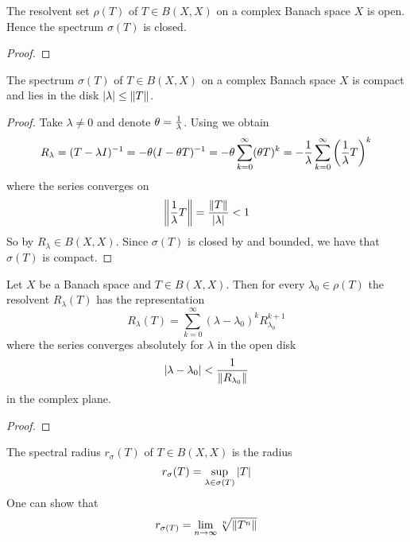 \documentclass[../../script.tex]{subfiles}
\begin{document}
\begin{thm}\label{thm:20.6}
    The resolvent set $\rho(T)$ of $T \in B(X, X)$ on a complex Banach space $X$ is open. Hence the spectrum $\sigma(T)$ is closed.
\end{thm}
\begin{proof}
    \noproof
\end{proof}

\begin{thm}
    The spectrum $\sigma(T)$ of $T \in B(X, X)$ on a complex Banach space $X$ is compact and lies in the disk $\abs{\lambda} \le \norm{T}$.
\end{thm}
\begin{proof}
    Take $\lambda \ne 0$ and denote $\theta = \frac{1}{\lambda}$. Using  we obtain 
    \begin{equation}
        R_{\lambda} = (T - \lambda I)^{-1} = -\theta(I - \theta T)^{-1} = -\theta \sum_{k=0}^{\infty} (\theta T)^k = -\frac{1}{\lambda} \sum_{k=0}^{\infty} \left(\frac{1}{\lambda} T \right)^k
    \end{equation}
    where the series converges on 
    \begin{equation}
        \norm{\frac{1}{\lambda} T} = \frac{\norm{T}}{\abs{\lambda}} < 1
    \end{equation}
    So by  $R_{\lambda} \in B(X, X)$. Since $\sigma(T)$ is closed by  and bounded, we have that $\sigma(T)$ is compact.
\end{proof}

\begin{thm}
    Let $X$ be a Banach space and $T \in B(X, X)$. Then for every $\lambda_0 \in \rho(T)$ the resolvent $R_{\lambda}(T)$ has the representation
    \[
        R_{\lambda}(T) = \sum_{k=0}^{\infty} (\lambda - \lambda_0)^k R_{\lambda_0}^{k+1}
    \]
    where the series converges absolutely for $\lambda$ in the open disk 
    \[
        \abs{\lambda - \lambda_0} < \frac{1}{\norm{R_{\lambda_0}}}
    \]
    in the complex plane.
\end{thm}
\begin{proof}
    \noproof
\end{proof}

\begin{defi}
    The spectral radius $r_{\sigma}(T)$ of $T \in B(X, X)$ is the radius 
    \[
        r_{\sigma}(T) = \sup_{\lambda \in \sigma(T)} \abs{T}
    \]
    One can show that 
    \[
        r_{\sigma(T)} = \lim_{n \rightarrow \infty} \sqrt[n]{\norm{T^n}}
    \]
\end{defi}
\end{document}
